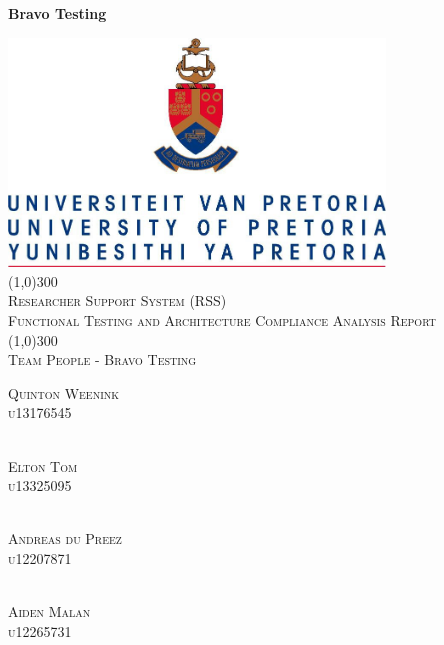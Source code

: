 \documentclass{article}
\begin{document}
	\newpage
	
	\vspace*{\fill}
	\begin{center}
	   	\Huge \textbf{Bravo Testing}
	\end{center}
	\vspace*{\fill}

\begin{titlepage}
	\begin{center}
		\includegraphics[width=10cm]{UP.jpg}  \\
		[1cm]
		\line(1,0){300} \\
		[0.3cm]
		\textsc{\Large
			Researcher Support System (RSS)\\
			Functional Testing and Architecture Compliance Analysis Report
		}\\
		[0.1cm]
		\line(1,0){300} \\
		[0.4cm]
		\textsc{\Large
			Team People - Bravo Testing
		} \\
		
	\end{center}
	\begin{flushright}
		\textsc{\large
			Quinton Weenink\\ 
			u13176545\\
		}
		
		\textsc{\large\\
			Elton Tom\\ 
			u13325095\\ 
		}
		
		\textsc{\large\\
			Andreas du Preez\\ 
			u12207871\\ 
		}
		
		\textsc{\large\\
			Aiden Malan\\ 
			u12265731\\ 
		}
		
	\end{flushright}
\end{titlepage}
\end{document}

